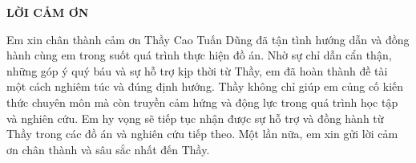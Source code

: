 \documentclass[../DoAn.tex]{subfiles}
\begin{document}
\begin{center}
    \Large{\textbf{LỜI CẢM ƠN}}\\
\end{center}
\vspace{1cm}
Em xin chân thành cảm ơn Thầy Cao Tuấn Dũng đã tận tình hướng dẫn và đồng hành cùng em trong suốt quá trình thực hiện đồ án. Nhờ sự chỉ dẫn cẩn thận, những góp ý quý báu và sự hỗ trợ kịp thời từ Thầy, em đã hoàn thành đề tài một cách nghiêm túc và đúng định hướng. Thầy không chỉ giúp em củng cố kiến thức chuyên môn mà còn truyền cảm hứng và động lực trong quá trình học tập và nghiên cứu. Em hy vọng sẽ tiếp tục nhận được sự hỗ trợ và đồng hành từ Thầy trong các đồ án và nghiên cứu tiếp theo. Một lần nữa, em xin gửi lời cảm ơn chân thành và sâu sắc nhất đến Thầy.
\end{document}
